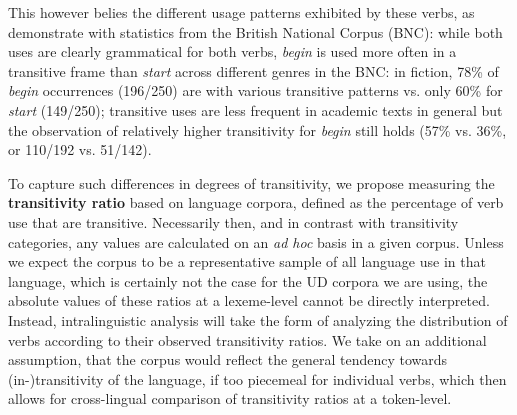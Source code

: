 \begin{exe}
\ex\label{example-begin_start}
  \begin{xlist}
  \end{xlist}
\end{exe}

This however belies the different usage patterns exhibited by these verbs, as \citet[95]{biber1998} demonstrate with statistics from the British National Corpus (BNC): while both uses are clearly grammatical for both verbs, \textit{begin} is used more often in a transitive frame than \textit{start} across different genres in the BNC: in fiction, 78\% of \textit{begin} occurrences (196/250) are with various transitive patterns vs. only 60\% for \textit{start} (149/250); transitive uses are less frequent in academic texts in general but the observation of relatively higher transitivity for \textit{begin} still holds (57\% vs. 36\%, or 110/192 vs. 51/142).

To capture such differences in degrees of transitivity, we propose measuring the \textbf{transitivity ratio} based on language corpora, defined as the percentage of verb use that are transitive. Necessarily then, and in contrast with transitivity categories, any values are calculated on an \textit{ad hoc} basis in a given corpus. Unless we expect the corpus to be a representative sample of all language use in that language, which is certainly not the case for the UD corpora we are using, the absolute values of these ratios at a lexeme-level cannot be directly interpreted. Instead, intralinguistic analysis will take the form of analyzing the distribution of verbs according to their observed transitivity ratios. We take on an additional assumption, that the corpus would reflect the general tendency towards (in-)transitivity of the language, if too piecemeal for individual verbs, which then allows for cross-lingual comparison of transitivity ratios at a token-level.

